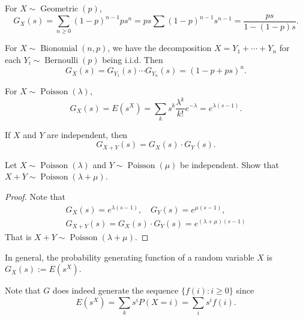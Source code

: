 \documentclass[11pt,singlecolumn, openany, citestyle=authoryear]{elegantbook}
\begin{document}
\begin{CJK}{UTF8}{gbsn}
\begin{example}
\end{example}
\begin{example}
    For $X\sim \operatorname{Geometric}(p)$, 
    $$
    G_X(s)=\sum_{n\geqslant 0}(1-p)^{n-1}ps^n
    =ps \sum (1-p)^{n-1}s^{n-1}=\frac{ps}{1-(1-p)s}.
    $$
\end{example}
\begin{example}
    For $X\sim \operatorname{Bionomial}(n,p)$, we have the decomposition
    $X=Y_1+\cdots+Y_n$ for each $Y_i\sim \operatorname{Bernoulli}(p)$ being i.i.d.
    Then 
    $$
    G_X(s)=G_{Y_1}(s)\cdots G_{Y_n}(s) = (1-p+ps)^n.
    $$
\end{example}
\begin{example}
    For $X\sim \operatorname{Poisson}(\lambda)$, 
    $$
    G_X(s)=E(s^X)=\sum_k s^k \frac{\lambda^k}{k!}e^{-\lambda}=e^{\lambda(s-1)}.  
    $$
\end{example}
\begin{corollary}
    If $X$ and $Y$ are independent, then 
    $$
    G_{X+Y}(s) = G_X(s)\cdot G_Y(s).
    $$
\end{corollary}

\begin{example}
    Let $X\sim \operatorname{Poisson}(\lambda)$ and $Y\sim \operatorname{Poisson}(\mu)$ be 
    independent. Show that $X+Y \sim \operatorname{Poisson}(\lambda+\mu)$.
\end{example}
\begin{proof}Note that 
    \begin{gather*}
        G_X(s) =e^{\lambda(s-1)},\quad G_Y(s)=e^{\mu(s-1)},\\ 
        G_{X+Y}(s) = G_X(s)\cdot G_Y(s) = e^{(\lambda+\mu)(s-1)}
    \end{gather*}
    That is $X+Y \sim \operatorname{Poisson}(\lambda+\mu)$.
\end{proof}

\begin{definition}
    In general, the probability generating function of a random variable
    $X$ is $G_X(s):=E(s^X)$.
\end{definition}
Note that $G$ does indeed generate the sequence $\{ f (i) : i \geqslant 0\}$ since
$$
E(s^X)=\sum_k s^i P(X=i)=\sum_i s^if(i).
$$


\end{CJK}
\end{document}

